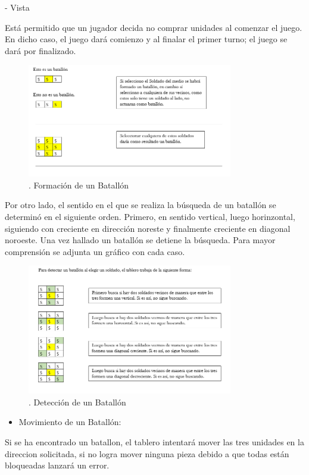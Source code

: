 \documentclass[titlepage,a4paper]{article}
\begin{document}
- Vista

Está permitido que un jugador decida no comprar unidades al comenzar el juego. En dicho caso, el juego dará comienzo y al finalar el primer turno; el juego se dará por finalizado. 



\begin{figure}[H]
\centering
\includegraphics[width=0.8\textwidth]{FormacionBatallon.png}
\caption{\label{fig:seq01}. Formación de un Batallón}
\end{figure}

Por otro lado, el sentido en el que se realiza la búsqueda de un batallón se determinó en el siguiente orden. Primero, en sentido vertical,  luego horinzontal, siguiendo con  creciente en dirección noreste y finalmente creciente en diagonal noroeste. Una vez hallado un batallón se detiene la búsqueda. 
Para mayor comprensión se adjunta un gráfico con cada caso. 

\begin{figure}[H]
\centering
\includegraphics[width=0.8\textwidth]{DeteccionBatallon.png}
\caption{\label{fig:seq01}. Detección de un Batallón}
\end{figure}


\begin{itemize}
\item Movimiento de un Batallón:
\end{itemize}
Si se ha encontrado un batallon, el tablero intentará mover las tres unidades 		en la direccion solicitada, si no logra mover ninguna pieza debido a que todas están 	  bloqueadas lanzará un error. 
\end{document}
